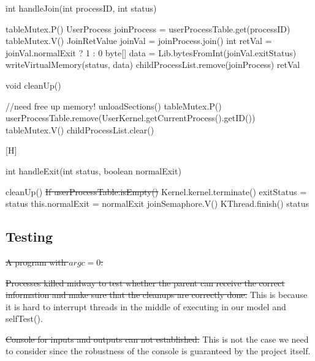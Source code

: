 \documentclass{article}
\begin{document}
\begin{spacing}{1.1}
\begin{algorithm}[H]
  \label{alg:handleJoin}
  \caption{int \textsf{handleJoin}(int processID, int status)}
  \colorbox{myyellow}{tableMutex.P()}\;
  UserProcess joinProcess = userProcessTable.get(processID)\;
  \colorbox{myyellow}{tableMutex.V()}\;
  {\color{red}
   {
  \;
   {
  \;
  }
  }
  JoinRetValue joinVal = joinProcess.join()\;
  int retVal = joinVal.normalExit ? 1 : 0\;
  byte[] data = Lib.bytesFromInt(joinVal.exitStatus)\;
  writeVirtualMemory(status, data)\; }
  childProcessList.remove(joinProcess)\;
  \Return retVal\;
\end{algorithm}

\begin{algorithm}
\label{alg:cleanUp}
\caption{void \textsf{cleanUp}()}
    \colorbox{myyellow}{//need free up memory!}\;
    unloadSections()\;
    \colorbox{myyellow}{tableMutex.P()}\;
    userProcessTable.remove(UserKernel.getCurrentProcess().getID())\;
    \colorbox{myyellow}{tableMutex.V()}\;
    childProcessList.clear()\;
\end{algorithm}

\begin{algorithm}
  \label{alg:handleExit}[H]
  \caption{int \textsf{handleExit}(int status, boolean normalExit)}
  \textsf{cleanUp}()\;
  {\color{red}\sout{If userProcessTable.isEmpty()} \;}
   {
    Kernel.kernel.terminate()\;
  }
  exitStatus = status\;
  this.normalExit = normalExit\;
  joinSemaphore.V()\;
  \colorbox{myyellow}{KThread.finish()}\;
  \Return status\;
\end{algorithm}
\subsection{Testing}
\begin{asparaitem}
  \item {\color{red}\sout{A program with $argc=0$.}}
  \item {\color{red}\sout{Processes killed midway to test whether the parent can receive the correct information and make sure that the cleanups are correctly done.}} This is because it is hard to interrupt threads in the middle of      executing in our model and \textsf{selfTest}().
  \item {\color{red} \sout{Console for inputs and outputs can not established.}} This is not the case we need to consider since the robustness of the console is guaranteed by the project itself.


\end{asparaitem}
\end{spacing}
\end{document}
